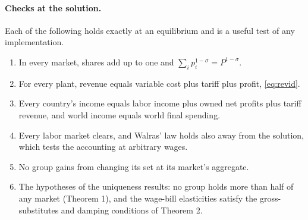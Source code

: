 \documentclass[11pt]{article}
\theoremstyle{remark}
\begin{document}
\paragraph{Checks at the solution.} Each of the following holds exactly at an
equilibrium and is a useful test of any implementation.
\begin{enumerate}
\item In every market, shares add up to one and $\sum_ip_i^{1-\sigma}=P^{1-\sigma}$.
\item For every plant, revenue equals variable cost plus tariff plus profit,
\eqref{eq:revid}.
\item Every country's income equals labor income plus owned net profits plus tariff
revenue, and world income equals world final spending.
\item Every labor market clears, and Walras' law holds also away from the solution,
which tests the accounting at arbitrary wages.
\item No group gains from changing its set at its market's aggregate.
\item The hypotheses of the uniqueness results: no group holds more than half of any
market (Theorem 1), and the wage-bill elasticities satisfy the gross-substitutes and
damping conditions of Theorem 2.
\end{enumerate}
\end{document}
